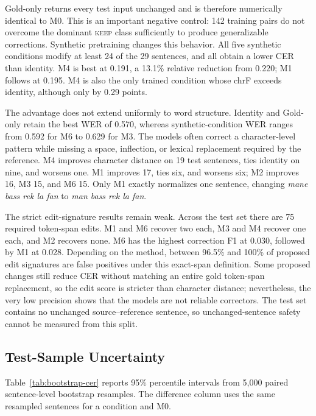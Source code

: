 \documentclass[12pt, a4paper, twoside, openany]{report}
\begin{document}
Gold-only returns every test input unchanged and is therefore numerically identical to M0. This is an important negative control: 142 training pairs do not overcome the dominant \textsc{keep} class sufficiently to produce generalizable corrections. Synthetic pretraining changes this behavior. All five synthetic conditions modify at least 24 of the 29 sentences, and all obtain a lower CER than identity. M4 is best at 0.191, a 13.1\% relative reduction from 0.220; M1 follows at 0.195. M4 is also the only trained condition whose chrF exceeds identity, although only by 0.29 points.

The advantage does not extend uniformly to word structure. Identity and Gold-only retain the best WER of 0.570, whereas synthetic-condition WER ranges from 0.592 for M6 to 0.629 for M3. The models often correct a character-level pattern while missing a space, inflection, or lexical replacement required by the reference. M4 improves character distance on 19 test sentences, ties identity on nine, and worsens one. M1 improves 17, ties six, and worsens six; M2 improves 16, M3 15, and M6 15. Only M1 exactly normalizes one sentence, changing \textit{mane bass rek la fan} to \textit{man bass rek la fan}.

The strict edit-signature results remain weak. Across the test set there are 75 required token-span edits. M1 and M6 recover two each, M3 and M4 recover one each, and M2 recovers none. M6 has the highest correction F1 at 0.030, followed by M1 at 0.028. Depending on the method, between 96.5\% and 100\% of proposed edit signatures are false positives under this exact-span definition. Some proposed changes still reduce CER without matching an entire gold token-span replacement, so the edit score is stricter than character distance; nevertheless, the very low precision shows that the models are not reliable correctors. The test set contains no unchanged source--reference sentence, so unchanged-sentence safety cannot be measured from this split.

\subsection{Test-Sample Uncertainty}

Table~\ref{tab:bootstrap-cer} reports 95\% percentile intervals from 5,000 paired sentence-level bootstrap resamples. The difference column uses the same resampled sentences for a condition and M0.
\end{document}
